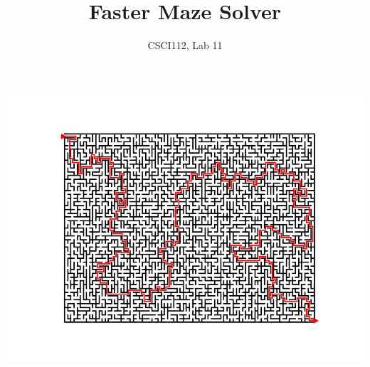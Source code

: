 \documentclass{article}
\title{Faster Maze Solver}
\author{CSCI112, Lab 11}
\begin{document}
\maketitle
\centerline{\includegraphics[scale=1]{Figure_1}}
\end{document}

